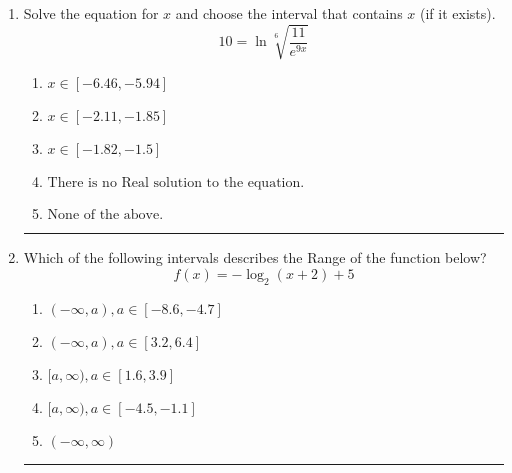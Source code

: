 \documentclass[14pt]{extbook}
\newcommand{\litem}[1]{\item#1\hspace*{-1cm}\rule{\textwidth}{0.4pt}}
\begin{document}
\begin{enumerate}
{\begin{enumerate}[label=\Alph*.]
\end{enumerate} }
\litem{
 Solve the equation for $x$ and choose the interval that contains $x$ (if it exists).\[  10 = \ln{\sqrt[6]{\frac{11}{e^{9x}}}} \]\begin{enumerate}[label=\Alph*.]
\item \( x \in [-6.46, -5.94] \)
\item \( x \in [-2.11, -1.85] \)
\item \( x \in [-1.82, -1.5] \)
\item \( \text{There is no Real solution to the equation.} \)
\item \( \text{None of the above.} \)

\end{enumerate} }
\litem{
Which of the following intervals describes the Range of the function below?\[ f(x) = -\log_2{(x+2)}+5 \]\begin{enumerate}[label=\Alph*.]
\item \( (-\infty, a), a \in [-8.6, -4.7] \)
\item \( (-\infty, a), a \in [3.2, 6.4] \)
\item \( [a, \infty), a \in [1.6, 3.9] \)
\item \( [a, \infty), a \in [-4.5, -1.1] \)
\item \( (-\infty, \infty) \)

\end{enumerate} }
\end{enumerate}
\end{document}
